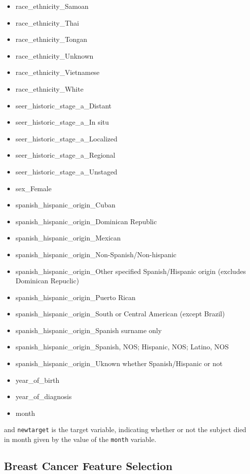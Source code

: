 \documentclass[10pt,letterpaper]{article}
\newcommand{\codewhite}[1]{\colorbox{white}{\texttt{#1}}}
\begin{document}
\begin{itemize}[noitemsep]
\item race\_ethnicity\_Samoan
\item race\_ethnicity\_Thai
\item race\_ethnicity\_Tongan
\item race\_ethnicity\_Unknown
\item race\_ethnicity\_Vietnamese
\item race\_ethnicity\_White
\item seer\_historic\_stage\_a\_Distant
\item seer\_historic\_stage\_a\_In situ
\item seer\_historic\_stage\_a\_Localized
\item seer\_historic\_stage\_a\_Regional
\item seer\_historic\_stage\_a\_Unstaged
\item sex\_Female
\item spanish\_hispanic\_origin\_Cuban
\item spanish\_hispanic\_origin\_Dominican Republic
\item spanish\_hispanic\_origin\_Mexican
\item spanish\_hispanic\_origin\_Non-Spanish/Non-hispanic
\item spanish\_hispanic\_origin\_Other specified Spanish/Hispanic origin (excludes Dominican Repuclic)
\item spanish\_hispanic\_origin\_Puerto Rican
\item spanish\_hispanic\_origin\_South or Central American (except Brazil)
\item spanish\_hispanic\_origin\_Spanish surname only
\item spanish\_hispanic\_origin\_Spanish, NOS; Hispanic, NOS; Latino, NOS
\item spanish\_hispanic\_origin\_Uknown whether Spanish/Hispanic or not
\item year\_of\_birth
\item year\_of\_diagnosis
\item month
\end{itemize}


and 
\codewhite{newtarget} is the target variable, indicating whether or not the subject died in month given by the value of the \codewhite{month} variable.

\subsection*{Breast Cancer Feature Selection}
\label{Breast_Cancer_Feature_Selection}
\end{document}

